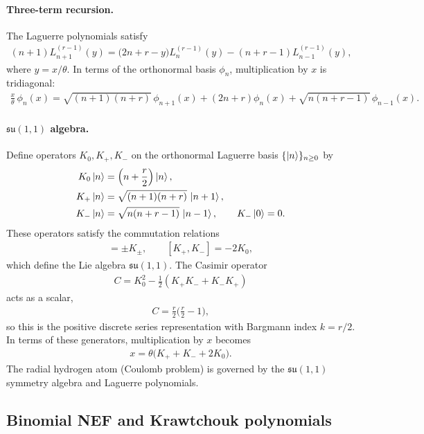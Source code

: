 \documentclass[a4paper,11pt]{article}
\numberwithin{equation}{section}
\theoremstyle{plain}
\theoremstyle{definition}
\theoremstyle{remark}
\newcommand{\1}{\ensuremath{\mathds{1}}\xspace}
\begin{document}
\paragraph{Three-term recursion.}
The Laguerre polynomials satisfy
\begin{align}
(n+1)L_{n+1}^{(r-1)}(y)
=
\big(2n+r-y\big)L_n^{(r-1)}(y)
-
(n+r-1)L_{n-1}^{(r-1)}(y),
\end{align}
where $y=x/\theta$.
In terms of the orthonormal basis $\phi_n$, multiplication by $x$ is tridiagonal:
\begin{align}
\frac{x}{\theta}\,\phi_n(x)
=
\sqrt{(n+1)(n+r)}\,\phi_{n+1}(x)
+
(2n+r)\phi_n(x)
+
\sqrt{n(n+r-1)}\,\phi_{n-1}(x).
\end{align}
\paragraph{$\mathfrak{su}(1,1)$ algebra.}
Define operators $K_0,K_+,K_-$ on the orthonormal Laguerre basis $\{\ket{n}\}_{n\ge0}$ by
\begin{align}
K_0\ket{n} &= \left(n+\frac{r}{2}\right)\ket{n},\\
K_+\ket{n} &= \sqrt{(n+1)(n+r)}\,\ket{n+1},\\
K_-\ket{n} &= \sqrt{n(n+r-1)}\,\ket{n-1},
\qquad K_-\ket{0}=0.
\end{align}
These operators satisfy the commutation relations
\begin{align}
[K_0,K_\pm]=\pm K_\pm,
\qquad
[K_+,K_-]=-2K_0,
\end{align}
which define the Lie algebra $\mathfrak{su}(1,1)$.
The Casimir operator
\begin{align}
C=K_0^2-\frac12(K_+K_-+K_-K_+)
\end{align}
acts as a scalar,
\begin{align}
C=\frac{r}{2}\Big(\frac{r}{2}-1\Big),
\end{align}
so this is the positive discrete series representation with Bargmann index $k=r/2$.
In terms of these generators, multiplication by $x$ becomes
\begin{align}
x=\theta\big(K_++K_-+2K_0\big).
\end{align}
The radial hydrogen atom (Coulomb problem) is governed by the $\mathfrak{su}(1,1)$ symmetry algebra and Laguerre polynomials.

\subsection{Binomial NEF and Krawtchouk polynomials}
\end{document}
